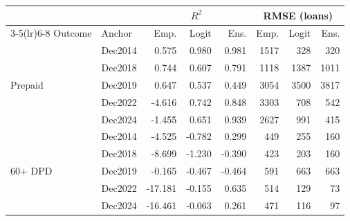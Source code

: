 \begin{tabular}{llrrrrrr}
\toprule
 & & \multicolumn{3}{c}{$R^2$} & \multicolumn{3}{c}{RMSE (loans)} \\
\cmidrule(lr){3-5}\cmidrule(lr){6-8}
Outcome & Anchor & Emp. & Logit & Ens. & Emp. & Logit & Ens. \\
\midrule
\multirow{5}{*}{Prepaid} & Dec2014 & 0.575 & 0.980 & 0.981 & 1517 & 328 & 320 \\
 & Dec2018 & 0.744 & 0.607 & 0.791 & 1118 & 1387 & 1011 \\
 & Dec2019 & 0.647 & 0.537 & 0.449 & 3054 & 3500 & 3817 \\
 & Dec2022 & -4.616 & 0.742 & 0.848 & 3303 & 708 & 542 \\
 & Dec2024 & -1.455 & 0.651 & 0.939 & 2627 & 991 & 415 \\
\midrule
\multirow{5}{*}{60+ DPD} & Dec2014 & -4.525 & -0.782 & 0.299 & 449 & 255 & 160 \\
 & Dec2018 & -8.699 & -1.230 & -0.390 & 423 & 203 & 160 \\
 & Dec2019 & -0.165 & -0.467 & -0.464 & 591 & 663 & 663 \\
 & Dec2022 & -17.181 & -0.155 & 0.635 & 514 & 129 & 73 \\
 & Dec2024 & -16.461 & -0.063 & 0.261 & 471 & 116 & 97 \\
\bottomrule
\end{tabular}
